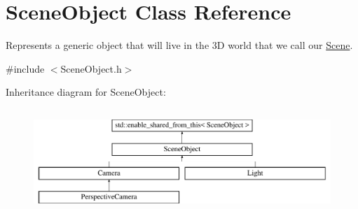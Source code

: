 \hypertarget{class_scene_object}{}\section{Scene\+Object Class Reference}
\label{class_scene_object}


Represents a generic object that will live in the 3D world that we call our \hyperlink{class_scene}{Scene}.  




{\ttfamily \#include $<$Scene\+Object.\+h$>$}

Inheritance diagram for Scene\+Object\+:\begin{figure}[H]
\begin{center}
\leavevmode
\includegraphics[height=3.985765cm]{class_scene_object}
\end{center}
\end{figure}
